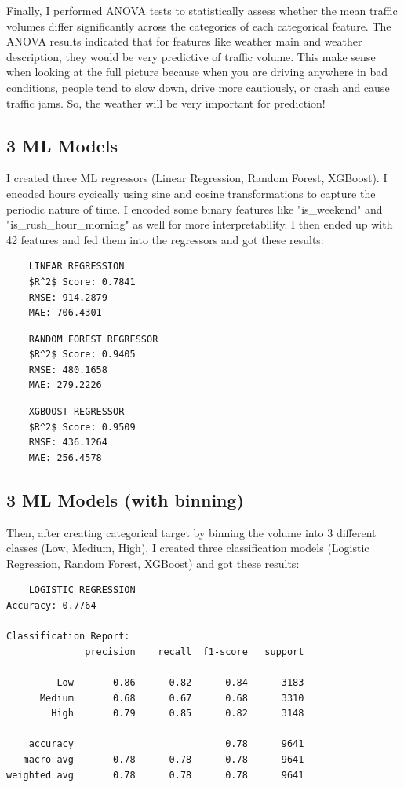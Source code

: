 \documentclass[12pt]{article}
\begin{document}
Finally, I performed ANOVA tests to statistically assess whether the mean traffic volumes differ significantly across the categories of each categorical feature.
The ANOVA results indicated that for features like weather main and weather description, they would be very predictive of traffic volume. This make sense when looking at the full picture because
when you are driving anywhere in bad conditions, people tend to slow down, drive more cautiously, or crash and cause traffic jams. So, the weather will be very important for prediction!

\subsection{3 ML Models}

I created three ML regressors (Linear Regression, Random Forest, XGBoost). I encoded hours cycically using sine and cosine transformations to capture the periodic nature of time. I encoded 
some binary features like "is\_weekend" and "is\_rush\_hour\_morning" as well for more interpretability. I then ended up with 42 features and fed them into the regressors and got these results:
\begin{lstlisting}
    LINEAR REGRESSION
    $R^2$ Score: 0.7841
    RMSE: 914.2879
    MAE: 706.4301
\end{lstlisting}

\begin{lstlisting}
    RANDOM FOREST REGRESSOR
    $R^2$ Score: 0.9405
    RMSE: 480.1658
    MAE: 279.2226
\end{lstlisting}

\begin{lstlisting}
    XGBOOST REGRESSOR
    $R^2$ Score: 0.9509
    RMSE: 436.1264
    MAE: 256.4578
\end{lstlisting}

\subsection{3 ML Models (with binning)}

Then, after creating categorical target by binning the volume into 3 different classes (Low, Medium, High), I created three classification models (Logistic Regression, Random Forest, XGBoost) and got these results:
\begin{lstlisting}
    LOGISTIC REGRESSION
Accuracy: 0.7764

Classification Report:
              precision    recall  f1-score   support

         Low       0.86      0.82      0.84      3183
      Medium       0.68      0.67      0.68      3310
        High       0.79      0.85      0.82      3148

    accuracy                           0.78      9641
   macro avg       0.78      0.78      0.78      9641
weighted avg       0.78      0.78      0.78      9641
\end{lstlisting}
\end{document}
